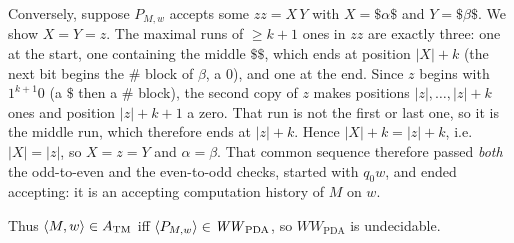 \begin{soln}
Conversely, suppose $P_{M,w}$ accepts some $zz=X\,Y$ with $X=\$\alpha\$$ and $Y=\$\beta\$$. We show $X=Y=z$. The maximal runs of $\ge k+1$ ones in $zz$ are exactly three: one at the start, one containing the middle $\$\$$, which ends at position $|X|+k$ (the next bit begins the $\#$ block of $\beta$, a $0$), and one at the end. Since $z$ begins with $1^{k+1}0$ (a $\$$ then a $\#$ block), the second copy of $z$ makes positions $|z|,\dots,|z|+k$ ones and position $|z|+k+1$ a zero. That run is not the first or last one, so it is the middle run, which therefore ends at $|z|+k$. Hence $|X|+k=|z|+k$, i.e.\ $|X|=|z|$, so $X=z=Y$ and $\alpha=\beta$. That common sequence therefore passed \emph{both} the odd-to-even and the even-to-odd checks, started with $q_0w$, and ended accepting: it is an accepting computation history of $M$ on $w$.

Thus $\langle M,w\rangle\in A_{\mathrm{TM}}$ iff $\langle P_{M,w}\rangle\in\mathit{WW}_{\mathrm{PDA}}$, so $\mathit{WW}_{\mathrm{PDA}}$ is undecidable.
\end{soln}

